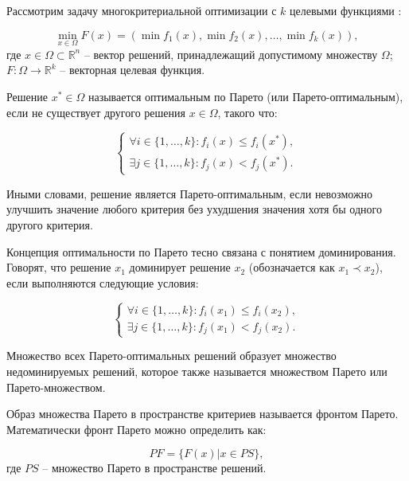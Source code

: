 Рассмотрим задачу многокритериальной оптимизации с $k$ целевыми функциями \cite*{deb2001multi}:

\begin{equation*}
    \min_{x \in \Omega} F(x) = (\min f_1(x), \min f_2(x), \ldots, \min f_k(x)),
\end{equation*}
где $x \in \Omega \subset \mathbb{R}^n$ -- вектор решений, принадлежащий допустимому множеству $\Omega$;
$F: \Omega \rightarrow \mathbb{R}^k$ -- векторная целевая функция.

Решение $x^* \in \Omega$ называется оптимальным по Парето
(или Парето-оптимальным), если не существует другого решения $x \in \Omega$, такого что:

\begin{equation*}
    \begin{cases}
        \forall i \in \{1, \ldots, k\}: f_i(x) \leq f_i(x^*), \\
        \exists j \in \{1, \ldots, k\}: f_j(x) < f_j(x^*).
    \end{cases}
\end{equation*}

Иными словами, решение является Парето-оптимальным, если невозможно
улучшить значение любого критерия без ухудшения значения хотя бы одного другого критерия.

Концепция оптимальности по Парето тесно связана с понятием доминирования.
Говорят, что решение $x_1$ доминирует решение $x_2$ (обозначается как $x_1 \prec x_2$), если выполняются следующие условия:

\begin{equation*}
    \begin{cases}
        \forall i \in \{1, \ldots, k\}: f_i(x_1) \leq f_i(x_2), \\
        \exists j \in \{1, \ldots, k\}: f_j(x_1) < f_j(x_2).
    \end{cases}
\end{equation*}

Множество всех Парето-оптимальных решений образует множество
недоминируемых решений, которое также называется множеством Парето или Парето-множеством.

Образ множества Парето в пространстве критериев называется фронтом Парето. Математически фронт Парето можно определить как:

\begin{equation*}
    PF = \{F(x) | x \in PS\},
\end{equation*}
где $PS$ -- множество Парето в пространстве решений.

